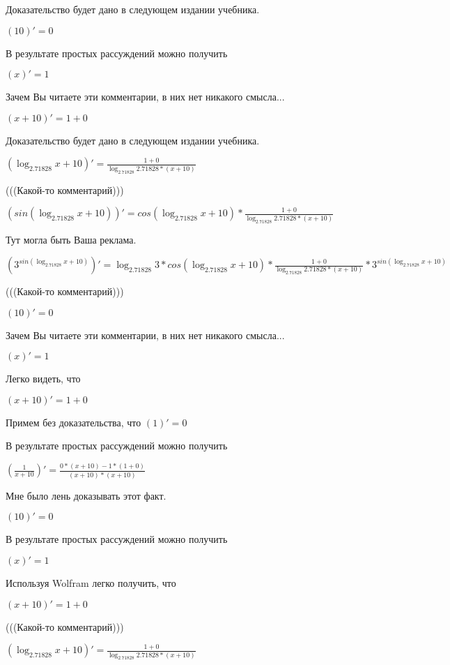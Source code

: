 \documentclass[12pt,a4paper,fleqn]{article}
\theoremstyle{definition}
\begin{document}
Доказательство будет дано в следующем издании учебника.

$( 10 )' =  0 $

В результате простых рассуждений можно получить

$( x )' =  1 $

Зачем Вы читаете эти комментарии, в них нет никакого смысла...

$( x  +  10 )' =  1  +  0 $

Доказательство будет дано в следующем издании учебника.

$(\log_{ 2.71828 }{ x  +  10 })' = \frac{ 1  +  0 }{\log_{ 2.71828 }{ 2.71828 } * ( x  +  10 )}
$

(((Какой-то комментарий)))

$(sin(\log_{ 2.71828 }{ x  +  10 }))' = cos(\log_{ 2.71828 }{ x  +  10 }) * \frac{ 1  +  0 }{\log_{ 2.71828 }{ 2.71828 } * ( x  +  10 )}
$

Тут могла быть Ваша реклама.

$({ 3 }^{sin(\log_{ 2.71828 }{ x  +  10 })})' = \log_{ 2.71828 }{ 3 } * cos(\log_{ 2.71828 }{ x  +  10 }) * \frac{ 1  +  0 }{\log_{ 2.71828 }{ 2.71828 } * ( x  +  10 )}
 * { 3 }^{sin(\log_{ 2.71828 }{ x  +  10 })}$

(((Какой-то комментарий)))

$( 10 )' =  0 $

Зачем Вы читаете эти комментарии, в них нет никакого смысла...

$( x )' =  1 $

Легко видеть, что

$( x  +  10 )' =  1  +  0 $

Примем без доказательства, что
$( 1 )' =  0 $

В результате простых рассуждений можно получить

$(\frac{ 1 }{ x  +  10 }
)' = \frac{ 0  * ( x  +  10 ) -  1  * ( 1  +  0 )}{( x  +  10 ) * ( x  +  10 )}
$

Мне было лень доказывать этот факт.

$( 10 )' =  0 $

В результате простых рассуждений можно получить

$( x )' =  1 $

Используя Wolfram легко получить, что

$( x  +  10 )' =  1  +  0 $

(((Какой-то комментарий)))

$(\log_{ 2.71828 }{ x  +  10 })' = \frac{ 1  +  0 }{\log_{ 2.71828 }{ 2.71828 } * ( x  +  10 )}
$
\end{document}
